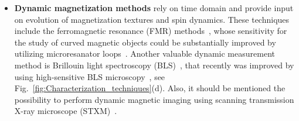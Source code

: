 \begin{itemize}
	\item \textbf{Dynamic magnetization methods} rely on time domain and provide input on evolution of magnetization textures and spin dynamics. These techniques include the ferromagnetic resonance (FMR) methods~\cite{Liedke13}, whose sensitivity for the study of curved magnetic objects could be substantially improved by utilizing microresanator loops~\cite{Lenz19}. Another valuable dynamic measurement method is Brillouin light spectroscopy (BLS)~\cite{Demokritov01}, that recently was improved by using high-sensitive BLS microscopy~\cite{Vogt12,Vogt14,Schultheiss19}, see Fig.~\ref{fig:Characterization_techniques}(d). Also, it should be mentioned the possibility to perform dynamic magnetic imaging using scanning transmission X-ray microscope (STXM)~\cite{Wintz11,Streubel15,Streubel15d,Wintz16,Woo16,Zimmermann18,Sluka19}.
\end{itemize}



